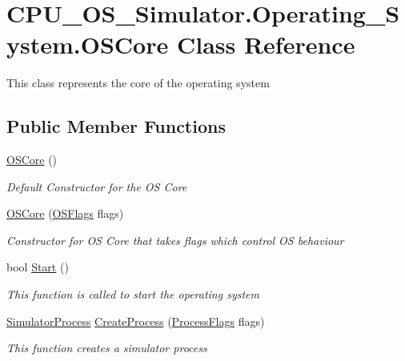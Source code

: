 \hypertarget{class_c_p_u___o_s___simulator_1_1_operating___system_1_1_o_s_core}{}\section{C\+P\+U\+\_\+\+O\+S\+\_\+\+Simulator.\+Operating\+\_\+\+System.\+O\+S\+Core Class Reference}
\label{class_c_p_u___o_s___simulator_1_1_operating___system_1_1_o_s_core}


This class represents the core of the operating system  


\subsection*{Public Member Functions}
\begin{DoxyCompactItemize}
\item 
\hyperlink{class_c_p_u___o_s___simulator_1_1_operating___system_1_1_o_s_core_a3845ed83851b87e64d6918a2a495e45e}{O\+S\+Core} ()
\begin{DoxyCompactList}\small\item\em Default Constructor for the O\+S Core \end{DoxyCompactList}\item 
\hyperlink{class_c_p_u___o_s___simulator_1_1_operating___system_1_1_o_s_core_a65c809ada2e4d0d5f6269e6a9009db0d}{O\+S\+Core} (\hyperlink{struct_c_p_u___o_s___simulator_1_1_operating___system_1_1_o_s_flags}{O\+S\+Flags} flags)
\begin{DoxyCompactList}\small\item\em Constructor for O\+S Core that takes flags which control O\+S behaviour \end{DoxyCompactList}\item 
bool \hyperlink{class_c_p_u___o_s___simulator_1_1_operating___system_1_1_o_s_core_adb8186aefcc47d02daa0856e5c9c42b7}{Start} ()
\begin{DoxyCompactList}\small\item\em This function is called to start the operating system \end{DoxyCompactList}\item 
\hyperlink{class_c_p_u___o_s___simulator_1_1_operating___system_1_1_simulator_process}{Simulator\+Process} \hyperlink{class_c_p_u___o_s___simulator_1_1_operating___system_1_1_o_s_core_afee9dd12629e415c420fc7c197f784c4}{Create\+Process} (\hyperlink{struct_c_p_u___o_s___simulator_1_1_operating___system_1_1_process_flags}{Process\+Flags} flags)
\begin{DoxyCompactList}\small\item\em This function creates a simulator process \end{DoxyCompactList}\end{DoxyCompactItemize}
